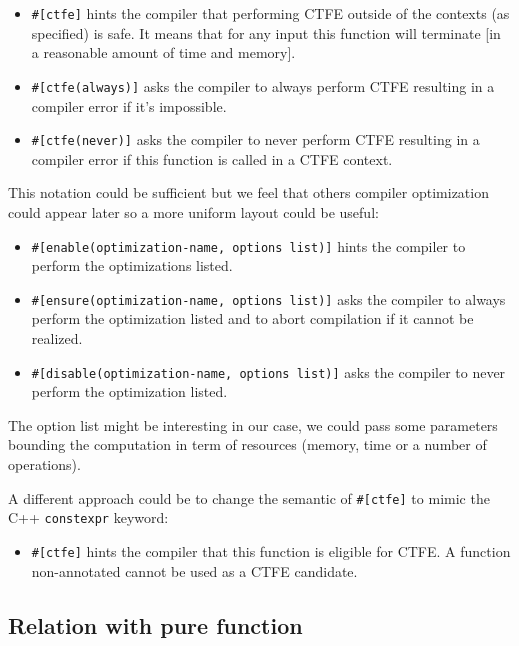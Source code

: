 \documentclass[a4paper,11pt]{article}
\begin{document}
\begin{itemize}
\item \lstinline{#[ctfe]} hints the compiler that performing CTFE outside of the contexts (as specified) is safe. It means that for any input this function will terminate [in a reasonable amount of time and memory].
\item \lstinline{#[ctfe(always)]} asks the compiler to always perform CTFE resulting in a compiler error if it's impossible.
\item \lstinline{#[ctfe(never)]} asks the compiler to never perform CTFE resulting in a compiler error if this function is called in a CTFE context.
\end{itemize}

This notation could be sufficient but we feel that others compiler optimization could appear later so a more uniform layout could be useful:

\begin{itemize}
\item \lstinline{#[enable(optimization-name, options list)]} hints the compiler to perform the optimizations listed.
\item \lstinline{#[ensure(optimization-name, options list)]} asks the compiler to always perform the optimization listed and to abort compilation if it cannot be realized.
\item \lstinline{#[disable(optimization-name, options list)]} asks the compiler to never perform the optimization listed.
\end{itemize}

The option list might be interesting in our case, we could pass some parameters bounding the computation in term of resources (memory, time or a number of operations).
\newline

A different approach could be to change the semantic of \lstinline{#[ctfe]} to mimic the C++ \lstinline{constexpr} keyword:

\begin{itemize}
\item \lstinline{#[ctfe]} hints the compiler that this function is eligible for CTFE. A function non-annotated cannot be used as a CTFE candidate.
\end{itemize}

\subsection{Relation with pure function}
\label{relation-pure}
\end{document}
